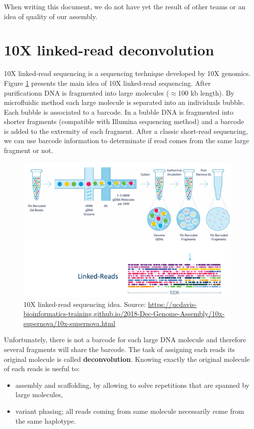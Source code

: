 \documentclass[main.tex]{subfiles}
\begin{document}
When writing this document, we do not have yet the result  of other teams or an idea of quality of our assembly.

\section{10X linked-read deconvolution} \label{section:other_contribution:10x}

10X linked-read sequencing is a sequencing technique developed by 10X genomics. Figure \ref{fig:other_contribution:10x} presents the main idea of 10X linked-read sequencing. After purificationn DNA is fragmented into large molecules ($\approx$100 kb length). By microfluidic method each large molecule is separated into an individuals bubble. Each bubble is associated to a barcode. In a bubble DNA is fragmented into shorter fragments (compatible with Illumina sequencing method) and a barcode is added to the extremity of each fragment. After a classic short-read sequencing, we can use barcode information to determinate if read comes from the same large fragment or not.

\begin{figure}
    \centering
    \includegraphics[width=\textwidth]{other_contribution/images/Linked_reads.png}
    \caption{10X linked-read sequencing idea. Source: \url{https://ucdavis-bioinformatics-training.github.io/2018-Dec-Genome-Assembly/10x-supernova/10x-supernova.html}}
    \label{fig:other_contribution:10x}
\end{figure}

Unfortunately, there is not a barcode for each large DNA molecule and therefore several fragments will share the barcode. The task of assigning each reads its original molecule is called \textbf{deconvolution}. Knowing exactly the original molecule of each reads is useful to: 
\begin{itemize}
    \item assembly and scaffolding, by allowing to solve repetitions that are spanned by large molecules,
    \item variant phasing; all reads coming from same molecule necessarily come from the same haplotype.
\end{itemize}
 
\end{document}
